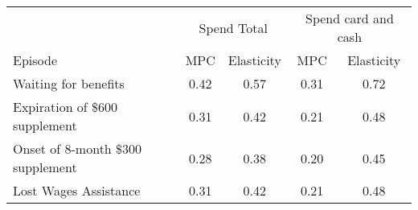 \begin{tabular}{lcccc}
  \toprule \toprule
& \multicolumn{2}{c}{Spend Total} & \multicolumn{2}{c}{Spend card and cash}\\ 
\cmidrule(r){2-3} \cmidrule(r){4-5}
Episode & MPC & Elasticity & MPC & Elasticity \\
  \midrule
Waiting for benefits & 0.42 & 0.57 & 0.31 & 0.72 \\ 
  Expiration of \$600 supplement & 0.31 & 0.42 & 0.21 & 0.48 \\ 
  Onset of 8-month \$300 supplement & 0.28 & 0.38 & 0.20 & 0.45 \\ 
  Lost Wages Assistance & 0.31 & 0.42 & 0.21 & 0.48 \\ 
   \bottomrule
\end{tabular}
